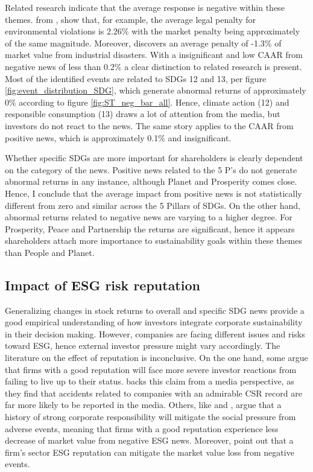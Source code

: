 Related research indicate that the average response is negative within these themes.  
from \cite{karpoff2005reputational}, show that, for example, the average legal penalty for environmental violations is 2.26\% with the market penalty being approximately of the same magnitude. Moreover, \cite{capelle2010does} discovers an average penalty of -1.3\% of market value from industrial disasters. With a insignificant and low CAAR from negative news of less than 0.2\% a clear distinction to related research is present. Most of the identified events are related to SDGs 12 and 13, per figure \ref{fig:event_distribution_SDG}, which generate abnormal returns of approximately 0\% according to figure \ref{fig:ST_neg_bar_all}. Hence, climate action (12) and responsible consumption (13) draws a lot of attention from the media, but investors do not react to the news. The same story applies to the CAAR from positive news, which is approximately 0.1\% and insignificant. 



Whether specific SDGs are more important for shareholders is clearly dependent on the category of the news. Positive news related to the 5 P's do not generate abnormal returns in any instance, although Planet and Prosperity comes close. Hence, I conclude that the average impact from positive news is not statistically different from zero and similar across the 5 Pillars of SDGs. On the other hand, abnormal returns related to negative news are varying to a higher degree. For Prosperity, Peace and Partnership the returns are significant, hence it appears shareholders attach more importance to sustainability goals within these themes than People and Planet.    

\subsection{Impact of ESG risk reputation} \label{ESG_reputation}

Generalizing changes in stock returns to overall and specific SDG news provide a good empirical understanding of how investors integrate corporate sustainability in their decision making. However, companies are facing different issues and risks toward ESG, hence external investor pressure might vary accordingly. 
The literature on the effect of reputation is inconclusive. On the one hand, some argue that firms with a good reputation will face more severe investor reactions from failing to live up to their status. \cite{noNewsgoodnews} backs this claim from a media perspective, as they find that accidents related to companies with an admirable CSR record are far more likely to be reported in the media. Others, like \cite{flammer2013corporate} and \cite{godfrey2009relationship}, argue that a history of strong corporate responsibility will mitigate the social pressure from adverse events, meaning that firms with a good reputation experience less decrease of market value from negative ESG news. Moreover, \cite{Blancard_ESG_sentiment} point out that a firm's sector ESG reputation can mitigate the market value loss from negative events.  

